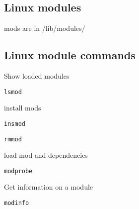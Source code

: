 
\subsection{Linux modules}
mods are in /lib/modules/

\subsection{Linux module commands}

Show loaded modules
\begin{verbatim}
lsmod
\end{verbatim}

install mods

\begin{verbatim}
insmod
\end{verbatim}

\begin{verbatim}
rmmod
\end{verbatim}

load mod and dependencies
\begin{verbatim}
modprobe
\end{verbatim}

Get information on a module
\begin{verbatim}
modinfo
\end{verbatim}
